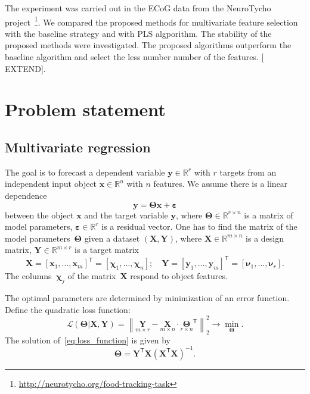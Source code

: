 \documentclass[12pt,oneside]{article}
\theoremstyle{definition}
\newcommand{\bx}{\mathbf{x}}
\newcommand{\by}{\mathbf{y}}
\newcommand{\bY}{\mathbf{Y}}
\newcommand{\bX}{\mathbf{X}}
\newcommand{\bbR}{\mathbb{R}}
\newcommand{\T}{\mathsf{T}}
\newcommand{\bchi}{\boldsymbol{\chi}}
\newcommand{\bnu}{\boldsymbol{\nu}}
\newcommand{\bTheta}{\boldsymbol{\Theta}}
\begin{document}
The experiment was carried out in the ECoG data from the NeuroTycho project~\footnote{\href{http://neurotycho.org/food-tracking-task}{http://neurotycho.org/food-tracking-task}}. 
We compared the proposed methods for multivariate feature selection with the baseline strategy and with PLS algporithm. 
The stability of the proposed methods were investigated.
The proposed algorithms outperform the baseline algorithm and select the less number number of the features. [{\color{red} EXTEND}].

\newpage
\section{Problem statement}
\subsection{Multivariate regression}
The goal is to forecast a dependent variable $\by \in \bbR^r$ with $r$ targets from an independent input object $\bx \in \bbR^n$ with $n$ features.
We assume there is a linear dependence
\begin{equation}
	\by = \bTheta \bx+ \boldsymbol{\varepsilon}
	\label{eq:model}
\end{equation}
between the object $\bx$ and the target variable $\by$,
where $\bTheta \in \bbR^{r \times n}$ is a matrix of model parameters, $\boldsymbol{\varepsilon} \in \bbR^{r}$ is a residual vector.
One has to find the matrix of the model parameters~$\bTheta$ given a dataset $\left( \bX, \bY \right)$, where $\bX \in \bbR^{m \times n}$ is a design matrix, $\bY \in \bbR^{m \times r}$ is a target matrix
\begin{equation}
	\bX = [\bx_1, \dots, \bx_m]^{\T} =  [\bchi_1, \dots, \bchi_n]; \quad \bY = [\by_1, \dots, \by_m]^{\T} =  [\bnu_1, \dots, \bnu_r].
\end{equation}
The columns~$\bchi_j$ of the matrix~$\bX$ respond to object features.

The optimal parameters are determined by minimization of an error function.
Define the quadratic loss function:
\begin{equation}
	\mathcal{L}(\bTheta | \bX, \bY) = {\left\| \underset{m \times r}{\mathbf{Y}}  - \underset{m \times n}{\bX} \cdot \underset{r \times n}{\bTheta}^{\T} \right\| }_2^2 \rightarrow\min_{\bTheta}.
\label{eq:loss_function}
\end{equation}
The solution of~\eqref{eq:loss_function} is given by
 \begin{equation}
 	\bTheta = \bY^{\T} \bX (\bX^{\T} \bX)^{-1}.
 \end{equation}
\end{document}
